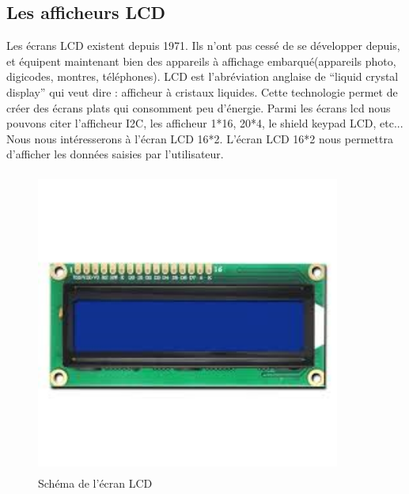 \documentclass[12pt, openany]{report}
\begin{document}
 \subsection{ Les afficheurs LCD}
  Les écrans LCD existent depuis 1971. Ils n'ont pas cessé de se développer depuis, et équipent maintenant bien des appareils à affichage embarqué(appareils photo, digicodes, montres, téléphones). LCD est l'abréviation anglaise de “liquid crystal display” qui veut dire : afficheur à cristaux liquides. Cette technologie permet de créer des écrans plats qui consomment peu d'énergie. Parmi les écrans lcd nous pouvons citer l'afficheur I2C, les afficheur 1*16, 20*4, le shield keypad LCD, etc... Nous nous intéresserons à l'écran LCD 16*2. L'écran LCD 16*2 nous permettra d'afficher les données saisies par l'utilisateur.
 \begin{figure}[!h]
                \centering
 \includegraphics[height=10cm,width=10cm]{composantes/lcd.png} 
         \caption{Schéma de l'écran LCD }
               		          		
               		          		 \end{figure}
                		 
\end{document}
